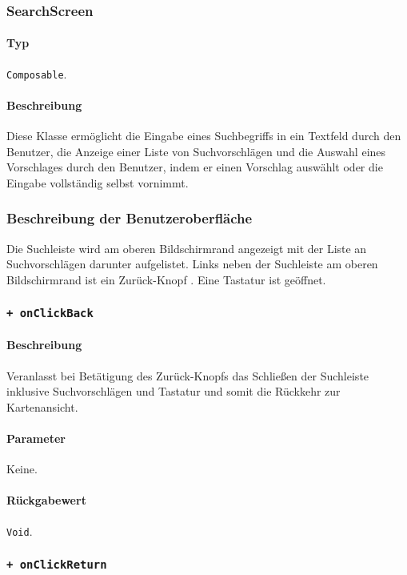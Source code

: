 \subsubsection{SearchScreen}\label{App_Search_SearchScreen}
\paragraph*{Typ}
\texttt{Composable}.
\paragraph*{Beschreibung}
Diese Klasse ermöglicht die Eingabe eines Suchbegriffs in ein Textfeld durch den Benutzer, 
die Anzeige einer Liste von Suchvorschlägen und die Auswahl eines Vorschlages durch den Benutzer, 
indem er einen Vorschlag auswählt oder die Eingabe vollständig selbst vornimmt.

\subsubsection*{Beschreibung der Benutzeroberfläche}
Die Suchleiste wird am oberen Bildschirmrand angezeigt mit der Liste an Suchvorschlägen darunter aufgelistet.
Links neben der Suchleiste am oberen Bildschirmrand ist ein \dq Zurück-Knopf \dq{}.
Eine Tastatur ist geöffnet.

\subsubsection*{\texttt{+ onClickBack}}\label{App_Search_SearchScreen_onClickBack}%
\paragraph*{Beschreibung}
Veranlasst bei Betätigung des \dq Zurück-Knopfs \dq{} das Schließen der Suchleiste inklusive Suchvorschlägen und Tastatur und somit die Rückkehr zur Kartenansicht.
\paragraph*{Parameter}
Keine.
\paragraph*{Rückgabewert}
\texttt{Void}.

\subsubsection*{\texttt{+ onClickReturn}}\label{App_Search_SearchScreen_onClickReturn}%
